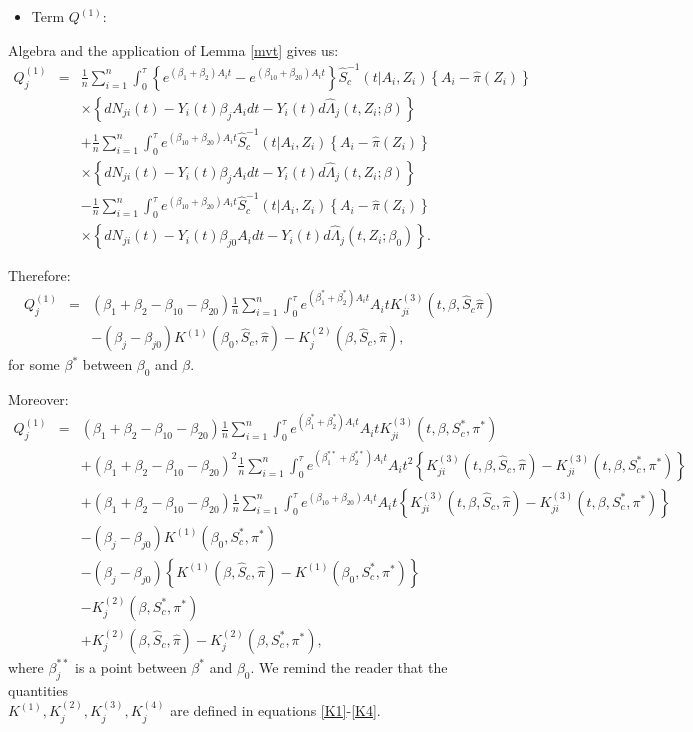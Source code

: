 \documentclass[11pt]{article}
\newcommand{\ee}{\end{eqnarray}}
\newcommand{\eqnn}{\begin{eqnarray*}}
\newcommand{\een}{\end{eqnarray*}}
\newcommand{\be}{\begin{eqnarray}}
\begin{document}
\begin{newproof7}
\begin{itemize}
\item{Term $Q^{(1)}$}:
\end{itemize}
Algebra and the application of Lemma \ref{mvt} gives us:
\eqnn
Q^{(1)}_j&=&\frac{1}{n}\sum_{i=1}^n\int_0^\tau \left\{e^{ (\beta_1  + \beta_2)A_i t}-e^{ (\beta_{10}  + \beta_{20}) A_i t}\right\}\hat S^{-1}_c(t | A_i,Z_i)\left\{A_i -\hat \pi( Z_i)\right\}\\&&\times\left\{dN_{ji}(t)-Y_i(t)\beta_jA_idt-Y_i(t)d\hat \Lambda_{j}(t, Z_i ; \beta)\right\}\nonumber\\
&&+\frac{1}{n}\sum_{i=1}^n\int_0^\tau e^{ (\beta_{10}  + \beta_{20}) A_i t}\hat S^{-1}_c(t | A_i,Z_i)\left\{A_i -\hat \pi( Z_i)\right\}\nonumber\\&&\times\left\{dN_{ji}(t)-Y_i(t)\beta_jA_idt-Y_i(t)d\hat \Lambda_{j}(t, Z_i ; \beta)\right\}\nonumber\\
&&-\frac{1}{n}\sum_{i=1}^n\int_0^\tau e^{ (\beta_{10}  + \beta_{20}) A_i t}\hat S^{-1}_c(t | A_i,Z_i)\left\{A_i -\hat \pi( Z_i)\right\}\nonumber\\&&\times\left\{dN_{ji}(t)-Y_i(t)\beta_{j0}A_idt-Y_i(t)d\hat \Lambda_{j}(t, Z_i ; \beta_0)\right\}.\nonumber\een

Therefore:
\eqnn
Q^{(1)}_j&=&(\beta_1+\beta_2-\beta_{10}-\beta_{20})\frac{1}{n}\sum_{i=1}^n\int_0^\tau e^{ (\beta^{*}_1  + \beta^{*}_2)A_i t}A_i t K^{(3)}_{ji}(t, \beta, \hat S_c \hat \pi)\\
&&-(\beta_j-\beta_{j0})K^{(1)}(\beta_0,\hat S_c,\hat \pi)-K^{(2)}_j(\beta,\hat S_c,\hat \pi),\een
for some $\beta^{*}$ between $\beta_0$ and $\beta$.

Moreover:
\be\label{3}
Q^{(1)}_j
&=&(\beta_1+\beta_2-\beta_{10}-\beta_{20})\frac{1}{n}\sum_{i=1}^n\int_0^\tau e^{ (\beta^{*}_1  + \beta^{*}_2)A_i t}A_i t K^{(3)}_{ji}(t, \beta,S^{*}_c,\pi^{*})\\
&&+(\beta_1+\beta_2-\beta_{10}-\beta_{20})^2\frac{1}{n}\sum_{i=1}^n\int_0^\tau e^{ (\beta^{**}_1  + \beta^{**}_2)A_i t}A_i t^2 \left\{K^{(3)}_{ji}(t, \beta,\hat S_c, \hat \pi)-K^{(3)}_{ji}(t, \beta,S^{*}_c, \pi^{*})\right\}\nonumber\\
&&+(\beta_1+\beta_2-\beta_{10}-\beta_{20})\frac{1}{n}\sum_{i=1}^n\int_0^\tau e^{ (\beta_{10}  + \beta_{20})A_i t}A_i t \left\{K^{(3)}_{ji}(t, \beta,\hat S_c, \hat \pi)-K^{(3)}_{ji}(t, \beta, S^{*}_c,\pi^{*})\right\}\nonumber\\
&&-(\beta_j-\beta_{j0})K^{(1)}(\beta_0,S^{*}_c,\pi^{*})\nonumber\\
&&-(\beta_j-\beta_{j0})\left\{K^{(1)}(\beta,\hat S_c, \hat\pi)-K^{(1)}(\beta_0,S^{*}_c,\pi^{*})\right\}\nonumber\\
&&-K^{(2)}_j(\beta,  S^{*}_c,\pi^{*})\nonumber\\
&&+K^{(2)}_j(\beta, \hat S_c,\hat \pi)-K^{(2)}_j(\beta, S^{*}_c,\pi^{*}),\nonumber
\ee
where $\beta^{**}_j$ is a point between $\beta^{*}$ and $\beta_0$.
We remind the reader that the quantities \\$K^{(1)}, K^{(2)}_{j}, K^{(3)}_j,K^{(4)}_{j}$ are defined in equations \eqref{K1}-\eqref{K4}.


\end{newproof7}
\end{document}
